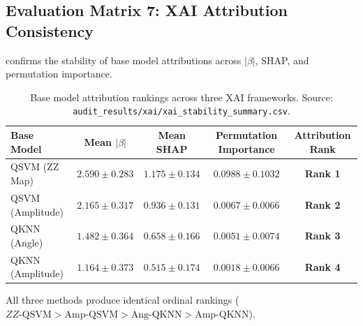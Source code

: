 \subsection{Evaluation Matrix 7: XAI Attribution Consistency}
 confirms the stability of base model attributions across $|\beta|$, SHAP, and permutation importance.

\begin{table}[H]
\centering
\small
\caption{Base model attribution rankings across three XAI frameworks. Source: \texttt{audit\_results/xai/xai\_stability\_summary.csv}.}
\label{tab:xai-consistency-summary}
\begin{tabularx}{\textwidth}{lcccc}
\toprule
\textbf{Base Model} & \textbf{Mean $|\beta|$} & \textbf{Mean SHAP} & \textbf{Permutation Importance} & \textbf{Attribution Rank} \\
\midrule
QSVM (ZZ Map)    & $2.590 \pm 0.283$ & $1.175 \pm 0.134$ & $0.0988 \pm 0.1032$ & \textbf{Rank 1} \\
QSVM (Amplitude) & $2.165 \pm 0.317$ & $0.936 \pm 0.131$ & $0.0067 \pm 0.0066$ & \textbf{Rank 2} \\
QKNN (Angle)     & $1.482 \pm 0.364$ & $0.658 \pm 0.166$ & $0.0051 \pm 0.0074$ & \textbf{Rank 3} \\
QKNN (Amplitude) & $1.164 \pm 0.373$ & $0.515 \pm 0.174$ & $0.0018 \pm 0.0066$ & \textbf{Rank 4} \\
\bottomrule
\end{tabularx}
\end{table}
All three methods produce identical ordinal rankings ($ZZ\text{-QSVM} > \text{Amp-QSVM} > \text{Ang-QKNN} > \text{Amp-QKNN}$).
